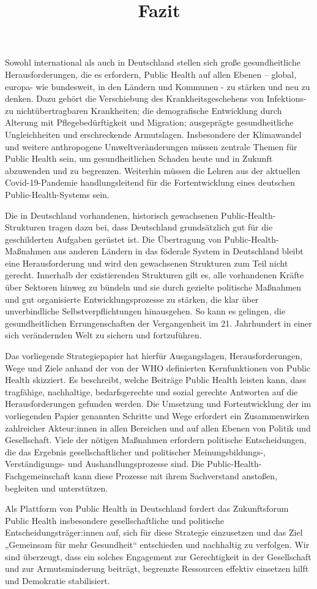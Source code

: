 \documentclass{article}
\begin{document}
\title{Fazit}

\maketitle


Sowohl international als auch in Deutschland stellen sich große gesundheitliche Herausforderungen, die es erfordern, Public Health auf allen Ebenen – global, europa- wie bundesweit, in den Ländern und Kommunen - zu stärken und neu zu denken. Dazu gehört die Verschiebung des Krankheitsgeschehens von Infektions- zu nichtübertragbaren Krankheiten; die demografische Entwicklung durch Alterung mit Pflegebedürftigkeit und Migration; ausgeprägte gesundheitliche Ungleichheiten und erschreckende Armutslagen. Insbesondere der Klimawandel und weitere anthropogene Umweltveränderungen müssen zentrale Themen für Public Health sein, um gesundheitlichen Schaden heute und in Zukunft abzuwenden und zu begrenzen. Weiterhin müssen die Lehren aus der aktuellen Covid-19-Pandemie handlungsleitend für die Fortentwicklung eines deutschen Public-Health-Systems sein.


Die in Deutschland vorhandenen, historisch gewachsenen Public-Health-Strukturen tragen dazu bei, dass Deutschland grundsätzlich gut für die geschilderten Aufgaben gerüstet ist. Die Übertragung von Public-Health-Maßnahmen aus anderen Ländern in das föderale System in Deutschland bleibt eine Herausforderung und wird den gewachsenen Strukturen zum Teil nicht gerecht. Innerhalb der existierenden Strukturen gilt es, alle vorhandenen Kräfte über Sektoren hinweg zu bündeln und sie durch gezielte politische Maßnahmen und gut organisierte Entwicklungsprozesse zu stärken, die klar über unverbindliche Selbstverpflichtungen hinausgehen. So kann es gelingen, die gesundheitlichen Errungenschaften der Vergangenheit im 21. Jahrhundert in einer sich verändernden Welt zu sichern und fortzuführen. 


Das vorliegende Strategiepapier hat hierfür Ausgangslagen, Herausforderungen, Wege und Ziele anhand der von der WHO definierten Kernfunktionen von Public Health skizziert. Es beschreibt, welche Beiträge Public Health leisten kann, dass tragfähige, nachhaltige, bedarfsgerechte und sozial gerechte Antworten auf die Herausforderungen gefunden werden. Die Umsetzung und Fortentwicklung der im vorliegenden Papier genannten Schritte und Wege erfordert ein Zusammenwirken zahlreicher Akteur:innen in allen Bereichen und auf allen Ebenen von Politik und Gesellschaft. Viele der nötigen Maßnahmen erfordern politische Entscheidungen, die das Ergebnis gesellschaftlicher und politischer Meinungsbildungs-, Verständigungs- und Aushandlungsprozesse sind. Die Public-Health-Fachgemeinschaft kann diese Prozesse mit ihrem Sachverstand anstoßen, begleiten und unterstützen.


Als Plattform von Public Health in Deutschland fordert das Zukunftsforum Public Health insbesondere gesellschaftliche und politische Entscheidungsträger:innen auf, sich für diese Strategie einzusetzen und das Ziel „Gemeinsam für mehr Gesundheit“ entschieden und nachhaltig zu verfolgen. Wir sind überzeugt, dass ein solches Engagement zur Gerechtigkeit in der Gesellschaft und zur Armutsminderung beiträgt, begrenzte Ressourcen effektiv einsetzen hilft und Demokratie stabilisiert.
\end{document}
